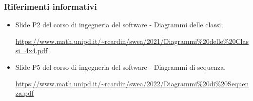 \subsubsection{Riferimenti informativi}
\begin{itemize}
    \item Slide P2 del corso di ingegneria del software - Diagrammi delle classi;
    \begin{center}
        \url{https://www.math.unipd.it/~rcardin/swea/2021/Diagrammi%20delle%20Classi_4x4.pdf}
    \end{center}
    \item Slide P5 del corso di ingegneria del software - Diagrammi di sequenza.
    \begin{center}
        \url{https://www.math.unipd.it/~rcardin/swea/2022/Diagrammi%20di%20Sequenza.pdf}
    \end{center}
\end{itemize}    